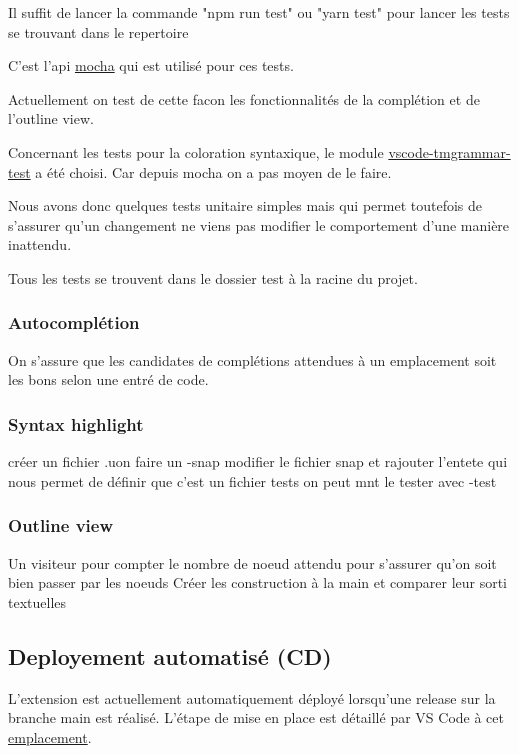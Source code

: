 \documentclass[
    iict, %
    il, %
]{heig-tb}
\begin{document}
Il suffit de lancer la commande "npm run test" ou "yarn test" pour lancer les tests se trouvant dans le repertoire %

C'est l'api \href{https://mochajs.org/api/}{mocha} qui est utilisé pour ces tests.

Actuellement on test de cette facon les fonctionnalités de la complétion et de l'outline view.

Concernant les tests pour la coloration syntaxique, le module \href{https://github.com/PanAeon/vscode-tmgrammar-test}{vscode-tmgrammar-test} a été choisi.
Car depuis mocha on a pas moyen de le faire.

Nous avons donc quelques tests unitaire simples mais qui permet toutefois de s'assurer qu'un changement ne viens pas modifier le comportement d'une manière inattendu.

Tous les tests se trouvent dans le dossier test à la racine du projet. %

\subsubsection{Autocomplétion}
On s'assure que les candidates de complétions attendues à un emplacement soit les bons selon une entré de code.

\subsubsection{Syntax highlight}
créer un fichier .uon
faire un -snap
modifier le fichier snap et rajouter l'entete qui nous permet de définir que c'est un fichier tests
on peut mnt le tester avec -test


\subsubsection{Outline view}
Un visiteur pour compter le nombre de noeud attendu pour s'assurer qu'on soit bien passer par les noeuds
Créer les construction à la main et comparer leur sorti textuelles



\subsection{Deployement automatisé (CD)}

L'extension est actuellement automatiquement déployé lorsqu'une release sur la branche main est réalisé.
L'étape de mise en place est détaillé par VS Code à cet \href{https://code.visualstudio.com/api/working-with-extensions/continuous-integration#github-actions}{emplacement}.
\end{document}
